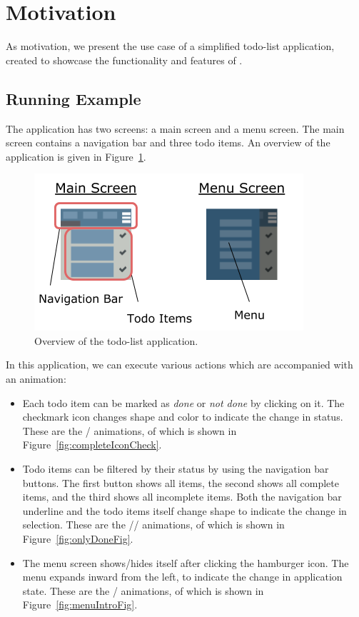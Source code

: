 \section{Motivation}
\label{sec:motivation}

As motivation, we present the use case of a simplified todo-list application, created to showcase the functionality and features of \dsl{}.

\subsection{Running Example}

The application has two screens: a main screen and a menu screen. The main screen contains a navigation bar and three todo items. An overview of the application is given in Figure~\ref{fig:appOverview}.

\begin{figure}[!htbp]
\centering
\includegraphics[width=\figscale\textwidth]{pictures/app_overview}
\caption{Overview of the todo-list application.}
\label{fig:appOverview}
\end{figure}

In this application, we can execute various actions which are accompanied with an animation:
\begin{itemize}
\item Each todo item can be marked as \emph{done} or \emph{not done} by clicking on it. The checkmark icon changes shape and color to indicate the change in status. These are the / animations, of which  is shown in Figure~\ref{fig:completeIconCheck}.
\item Todo items can be filtered by their status by using the navigation bar buttons. The first button shows all items, the second shows all complete items, and the third shows all incomplete items. Both the navigation bar underline and the todo items itself change shape to indicate the change in selection. These are the // animations, of which  is shown in Figure~\ref{fig:onlyDoneFig}.
\item The menu screen shows/hides itself after clicking the hamburger icon. The menu expands inward from the left, to indicate the change in application state. These are the / animations, of which  is shown in Figure~\ref{fig:menuIntroFig}.
\end{itemize}

